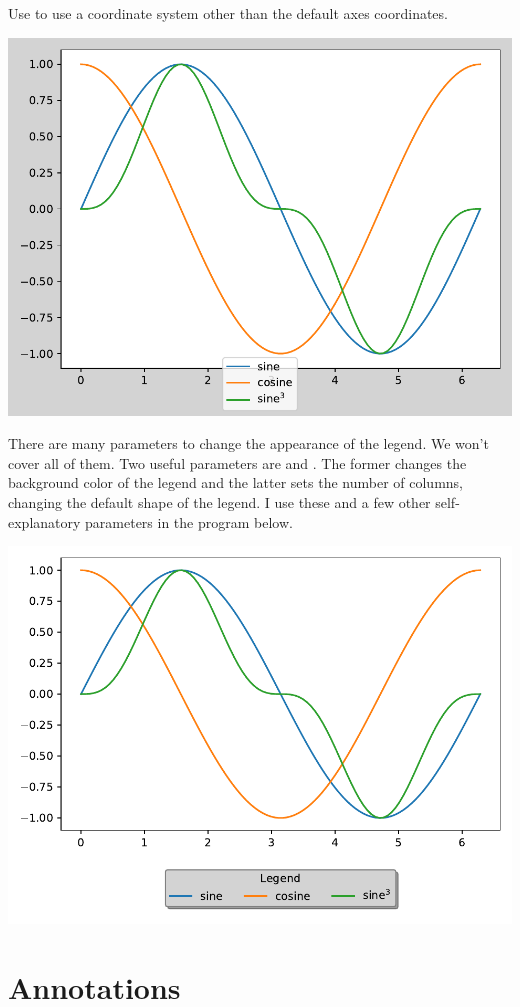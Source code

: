 Use  to use a coordinate system other than the default axes coordinates. 


\begin{center}
    \includegraphics[width = .7\textwidth]{figures/proseplots/legend-transform.pdf}
\end{center}

There are many parameters to change the appearance of the legend. We won't cover all of them. Two useful parameters are  and . The former changes the background color of the legend and the latter sets the number of columns, changing the default shape of the legend. I use these and a few other self-explanatory parameters in the program below. 


\begin{center}
    \includegraphics[width = .7\textwidth]{figures/proseplots/legend-shape.pdf}
\end{center}


\section{Annotations}

